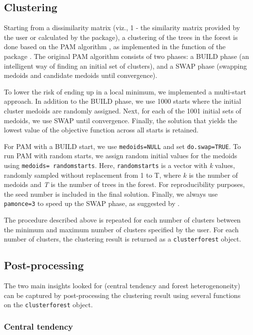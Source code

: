 \subsection{Clustering}
Starting from a dissimilarity matrix (viz., 1 - the similarity matrix provided by the user or calculated by the package), a clustering of the trees in the forest is done based on the PAM algorithm \citep{Kaufman2009}, as implemented in the  function of the  package \citep{Maechler2019}. The original PAM algorithm consists of two phases: a BUILD phase (an intelligent way of finding an initial set of clusters), and a SWAP phase (swapping medoids and candidate medoids until convergence). 

To lower the risk of ending up in a local minimum, we implemented a multi-start approach. In addition to the BUILD phase, we use 1000 starts where the initial cluster medoids are randomly assigned. Next, for each of the 1001 initial sets of medoids, we use SWAP until convergence. Finally, the solution that yields the lowest value of the objective function across all starts is retained.

For PAM with a BUILD start, we use \texttt{medoids=NULL} and set \texttt{do.swap=TRUE}. To run PAM with random starts, we assign random initial values for the medoids using \texttt{medoids= randomstarts}. Here, \texttt{randomstarts} is a vector with \textit{k} values, randomly sampled without replacement from 1 to T, where $k$ is the number of medoids and \textit{T} is the number of trees in the forest. For reproducibility purposes, the seed number is included in the final solution. Finally, we always use \texttt{pamonce=3} to speed up the SWAP phase, as suggested by \citet{schubert2019}.

The procedure described above is repeated for each number of clusters between the minimum and maximum
number of clusters specified by the user. For each number of clusters, the clustering result is returned as a \texttt{clusterforest} object. 



\subsection{Post-processing}
The two main insights looked for (central tendency and forest heterogenoneity) can be captured by post-processing the clustering result using several functions on the \texttt{clusterforest} object.

\subsubsection{Central tendency}

